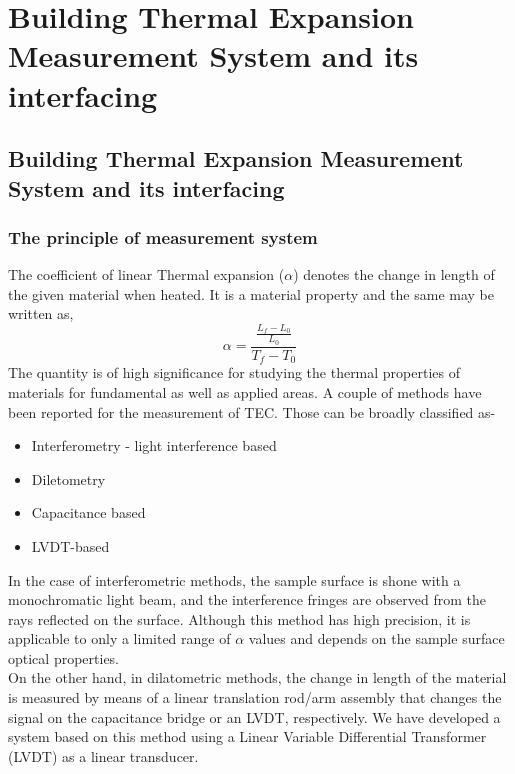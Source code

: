 
\chapter{Building Thermal Expansion Measurement System
and its interfacing} 
\label{Appendix A}

\section{Building Thermal Expansion Measurement System
and its interfacing}
\subsection{The principle of measurement system}
The coefficient of linear Thermal expansion ($\alpha$) denotes the change in length of the given
material when heated. It is a material property and the same may be written as, $$\alpha = \frac{\frac{L_{f}-L_{0}}{L_{0}}}{T_{f}-T_{0}}$$
The quantity is of high significance for studying the thermal properties of materials for
fundamental as well as applied areas. A couple of methods have been reported for the measurement of TEC. Those can be broadly classified
as-
\begin{itemize}
    \item Interferometry - light interference based
    \item Diletometry
    \item Capacitance based
    \item LVDT-based
\end{itemize}
In the case of interferometric methods, the sample surface is shone with a monochromatic light beam, and the interference fringes are observed from the rays reflected on the surface. Although this method has high precision, it is applicable to only a limited range of $\alpha$ values and depends on the sample surface optical properties.\\
On the other hand, in dilatometric methods, the change in length of the material is measured by means of a linear translation rod/arm assembly that changes the signal on the capacitance bridge or an LVDT, respectively. We have developed a system based on this method using a Linear Variable Differential Transformer (LVDT) as a linear transducer.
